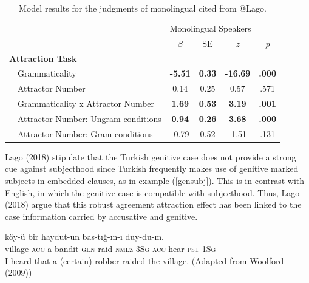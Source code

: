\documentclass[11pt,a4paper]{article}
\begin{document}
\begin{table}[!hbt]
\centering
\begin{tabular}{llcccc}
\hline
    &                                        & \multicolumn{4}{l}{Monolingual Speakers}                                               \\ \cline{3-6} 
    &                                        & $\beta$        & SE            & \emph{z} & \emph{p} \\ \hline
\multicolumn{2}{l}{\textbf{Attraction Task}} &                &               &                           &                           \\
    & Grammaticality                         & \textbf{-5.51} & \textbf{0.33} & \textbf{-16.69}           & \textbf{.000}             \\
    & Attractor Number                       & 0.14           & 0.25          & 0.57                      & .571                      \\
    & Grammaticality x Attractor Number      & \textbf{1.69}  & \textbf{0.53} & \textbf{3.19}             & \textbf{.001}             \\
    & Attractor Number: Ungram conditions    & \textbf{0.94}  & \textbf{0.26} & \textbf{3.68}             & \textbf{.000}             \\
    & Attractor Number: Gram conditions      & -0.79          & 0.52          & -1.51                     & .131                      \\ \hline
\end{tabular}
\caption{Model results for the judgments of monolingual cited from @Lago.}
\label{lagomodel}
\end{table}

Lago (2018) stipulate that the Turkish genitive case does not provide a
strong cue against subjecthood since Turkish frequently makes use of
genitive marked subjects in embedded clauses, as in example
(\ref{gensubj}). This is in contrast with English, in which the genitive
case is compatible with subjecthood. Thus, Lago (2018) argue that this
robust agreement attraction effect has been linked to the case
information carried by accusative and genitive.

\begin{exe}
\ex \label{gensubj}
\gll k\"{o}y-\"{u} bir haydut-un bas-t{\i}\u{g}-{\i}n-{\i} duy-du-m.\\
village-\textsc{acc} a bandit-\textsc{gen} raid-\textsc{nmlz}-\textsc{3Sg}-\textsc{acc} hear-\textsc{pst}-\textsc{1Sg}\\
\glt I heard that a (certain) robber raided the village. (Adapted from Woolford (2009))
\end{exe}
\end{document}
